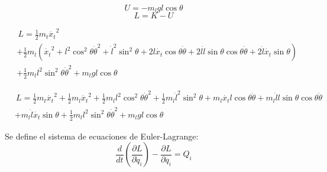 \documentclass{article}
\begin{document}
            \begin{equation}\label{eq:potential}
                U = -m_lgl\cos{\theta}
            \end{equation}
            \begin{equation}\label{eq:lagrange}
                L = K - U
            \end{equation}

            \begin{equation}\label{eq:lagrange2}
                \begin{split}
                    & \,L = \frac{1}{2}m_t\dot{x_t}^2 \\ 
                    &+\frac{1}{2}m_l(\dot{x_t}^2
                +l^2\cos^2{\theta}\dot{\theta}^2
                +\dot{l}^2\sin^2{\theta}+2l\dot{x_t}\cos{\theta}\dot{\theta}
                +2l\dot{l}\sin{\theta}\cos{\theta}\dot{\theta}
                +2\dot{l}\dot{x_t}\sin{\theta})\\
                &+\frac{1}{2}m_ll^2\sin^2{\theta}\dot{\theta}^2
                +m_lgl\cos{\theta}
                \end{split}
            \end{equation}

            \begin{equation}\label{eq:lagrange3}
                \begin{split}
                    & \,L = \frac{1}{2}m_t\dot{x_t}^2+\frac{1}{2}m_l\dot{x_t}^2
                    +\frac{1}{2}m_ll^2\cos^2{\theta}\dot{\theta}^2+\frac{1}{2}m_l\dot{l}^2\sin^2{\theta}
                +m_l\dot{x_t}l\cos{\theta}\dot{\theta}
                +m_l\dot{l}l\sin{\theta}\cos{\theta}\dot{\theta}\\
                &+m_l\dot{l}\dot{x_t}\sin{\theta}
                +\frac{1}{2}m_ll^2\sin^2{\theta}\dot{\theta}^2
                +m_lgl\cos{\theta}
                \end{split}
            \end{equation}

            Se define el sistema de ecuaciones de Euler-Lagrange:
            \begin{equation}\label{eq:euler1}
                \frac{d}{dt}\left(\frac{\partial L}{\partial \dot{q}_i}\right)-\frac{\partial L}{\partial q_i}=Q_i
            \end{equation}
\end{document}
